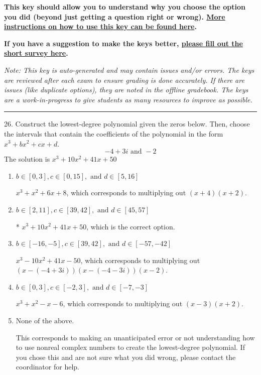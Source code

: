 \documentclass{extbook}[14pt]
\begin{document}
\textbf{This key should allow you to understand why you choose the option you did (beyond just getting a question right or wrong). \href{https://xronos.clas.ufl.edu/mac1105spring2020/courseDescriptionAndMisc/Exams/LearningFromResults}{More instructions on how to use this key can be found here}.}

\textbf{If you have a suggestion to make the keys better, \href{https://forms.gle/CZkbZmPbC9XALEE88}{please fill out the short survey here}.}

\textit{Note: This key is auto-generated and may contain issues and/or errors. The keys are reviewed after each exam to ensure grading is done accurately. If there are issues (like duplicate options), they are noted in the offline gradebook. The keys are a work-in-progress to give students as many resources to improve as possible.}

\rule{\textwidth}{0.4pt}

26. Construct the lowest-degree polynomial given the zeros below. Then, choose the intervals that contain the coefficients of the polynomial in the form $x^3+bx^2+cx+d$.
\[ -4 + 3i \text{ and } -2 \] 
The solution is $ x^{3} +10 x^{2} +41 x + 50 $ 

\begin{enumerate}[label=\Alph*.] 
\item $ b \in [0, 3], c \in [0, 15], \text{ and } d \in [5, 16] $ 

 $x^{3} + x^{2} +6 x + 8$, which corresponds to multiplying out $(x + 4)(x + 2)$. 
\item $ b \in [2, 11], c \in [39, 42], \text{ and } d \in [45, 57] $ 

 * $x^{3} +10 x^{2} +41 x + 50$, which is the correct option. 
\item $ b \in [-16, -5], c \in [39, 42], \text{ and } d \in [-57, -42] $ 

 $x^{3} -10 x^{2} +41 x -50$, which corresponds to multiplying out $(x-(-4 + 3i))(x-(-4 - 3i))(x -2)$. 
\item $ b \in [0, 3], c \in [-2, 3], \text{ and } d \in [-7, -3] $ 

 $x^{3} + x^{2} -x -6$, which corresponds to multiplying out $(x -3)(x + 2)$. 
\item $ \text{None of the above.} $ 

 This corresponds to making an unanticipated error or not understanding how to use nonreal complex numbers to create the lowest-degree polynomial. If you chose this and are not sure what you did wrong, please contact the coordinator for help. 
\end{enumerate} 
 
\end{document}
